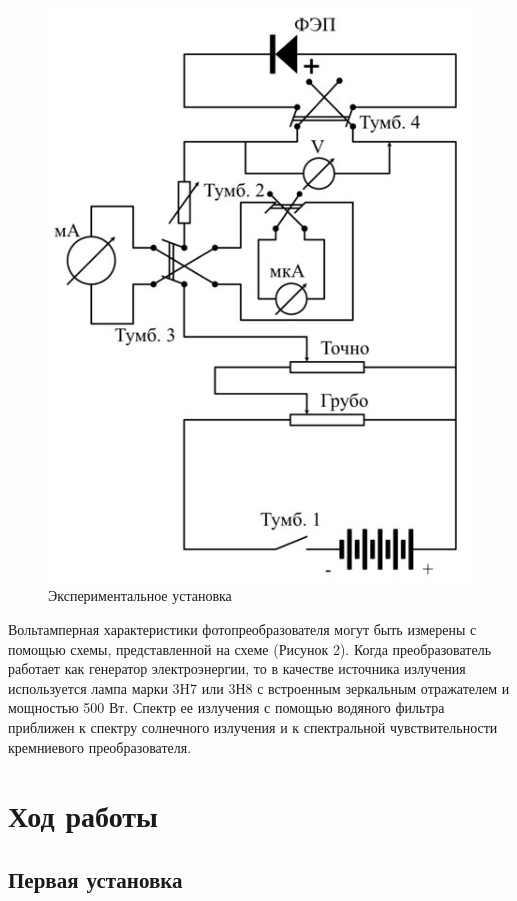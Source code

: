 \documentclass[a4paper,12pt]{article} %
\begin{document}
\begin{figure}[h!]
    \centering
    \includegraphics[scale=0.5]{1.jpg}
    \caption{Экспериментальное установка}
\end{figure}

Вольтамперная характеристики фотопреобразователя могут быть измерены с помощью схемы, представленной на схеме (Рисунок 2). Когда преобразователь работает как генератор электроэнергии, то в качестве источника излучения используется лампа марки 3H7 или 3Н8 с встроенным зеркальным отражателем и мощностью 500 Вт. Спектр ее излучения с помощью водяного фильтра приближен к спектру солнечного излучения и к спектральной чувствительности кремниевого преобразователя.

\section{Ход работы}
\subsection{Первая установка}
\end{document}
